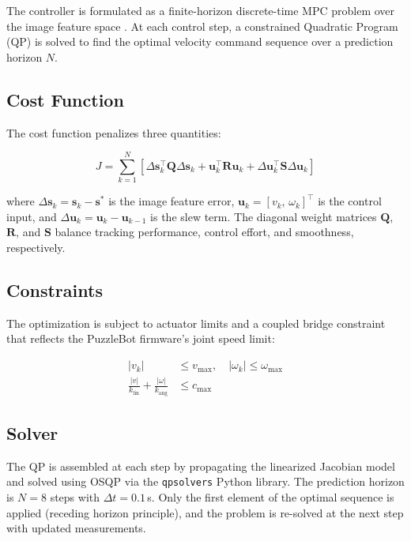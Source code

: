 \documentclass[journal, 10pt]{IEEEtran}
\begin{document}
The controller is formulated as a finite-horizon discrete-time MPC problem
over the image feature space \cite{rawlings2017}. At each control step, a
constrained Quadratic Program (QP) is solved to find the optimal velocity
command sequence over a prediction horizon $N$.

\subsection{Cost Function}

The cost function penalizes three quantities:

\begin{equation}
  J = \sum_{k=1}^{N} \left[
    \Delta\mathbf{s}_k^\top \mathbf{Q} \Delta\mathbf{s}_k
    + \mathbf{u}_k^\top \mathbf{R} \mathbf{u}_k
    + \Delta\mathbf{u}_k^\top \mathbf{S} \Delta\mathbf{u}_k
  \right]
  \label{eq:cost}
\end{equation}

where $\Delta\mathbf{s}_k = \mathbf{s}_k - \mathbf{s}^*$ is the image
feature error, $\mathbf{u}_k = [v_k,\,\omega_k]^\top$ is the control
input, and $\Delta\mathbf{u}_k = \mathbf{u}_k - \mathbf{u}_{k-1}$ is the
slew term. The diagonal weight matrices $\mathbf{Q}$, $\mathbf{R}$, and
$\mathbf{S}$ balance tracking performance, control effort, and smoothness,
respectively.

\subsection{Constraints}

The optimization is subject to actuator limits and a coupled bridge
constraint that reflects the PuzzleBot firmware's joint speed limit:

\begin{align}
  |v_k| &\leq v_{\max}, \quad |\omega_k| \leq \omega_{\max} \\
  \frac{|v|}{k_{\text{lin}}} + \frac{|\omega|}{k_{\text{ang}}} &\leq c_{\max}
  \label{eq:constraints}
\end{align}

\subsection{Solver}

The QP is assembled at each step by propagating the linearized Jacobian
model and solved using OSQP via the \texttt{qpsolvers} Python library. The
prediction horizon is $N=8$ steps with $\Delta t = 0.1$\,s. Only the first
element of the optimal sequence is applied (receding horizon principle),
and the problem is re-solved at the next step with updated measurements.
\end{document}
